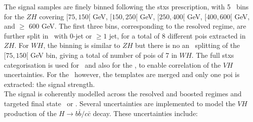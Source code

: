 The signal samples are finely binned following the \gls{stxs} prescription, with 5 \ptv\ bins for the $ZH$ covering $[75, 150[$ GeV, $[150, 250[$ GeV, $[250, 400[$ GeV, $[400, 600[$ GeV, and $\geq$ 600 GeV. The first three bins, corresponding to the resolved regime, are further split in \nj\ with 0-jet or $\geq 1$ jet, for a total of 8 different \gls{poi}s extracted in $ZH$. For $WH$, the binning is similar to $ZH$ but there is no an \nj\ splitting of the $[75, 150[$ GeV bin, giving a total of number of \gls{poi}s of 7 in $WH$. The full \gls{stxs} categorisation is used for \vhb\ and also for the \vhc, to enable correlation of the $VH$ uncertainties. For the \vhc\ however, the templates are merged and only one \gls{poi} is extracted: the signal strength.\\
  
The signal is coherently modelled across the resolved and boosted regimes and targeted final state \vhb\ or \vhc. Several uncertainties are implemented to model the $VH$ production of the $H \rightarrow b\bar{b}/c\bar{c}$ decay. These uncertainties include:
